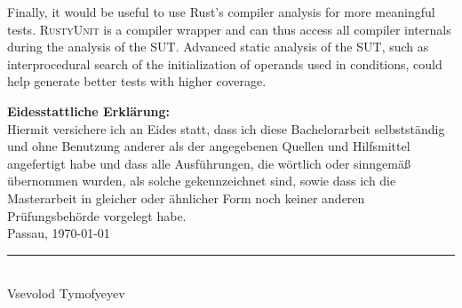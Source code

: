 \documentclass[paper=a4,%
  twoside,%
  BCOR4mm,%
  abstract=true,%
  toc=bibliography,%
  chapterprefix=true,%
  toc=bibliographynumbered,%
  open=right,%
  english,%
  pagesize=pdftex]{scrreprt}
\newcommand{\tech}{\textsc{RustyUnit}\xspace}
\newcommand{\sut}{\ac{SUT}\xspace}
\begin{document}
Finally, it would be useful to use Rust's compiler analysis for more meaningful tests. \tech is a compiler wrapper and can thus access all compiler internals during the analysis of the \sut. Advanced static analysis of the \sut, such as interprocedural search of the initialization of operands used in conditions, could help generate better tests with higher coverage. 


\backmatter%
\appendix
\cleardoublepage
\thispagestyle{empty}
\null\vfill
\noindent\textbf{Eidesstattliche Erklärung:}\\[1.5ex]
Hiermit versichere ich an Eides statt, dass ich diese Bachelorarbeit
selbstständig und ohne Benutzung anderer als der angegebenen Quellen und
Hilfsmittel angefertigt habe und dass alle Ausführungen, die wörtlich oder
sinngemäß übernommen wurden, als solche gekennzeichnet sind, sowie dass ich die
Masterarbeit in gleicher oder ähnlicher Form noch keiner anderen
Prüfungsbehörde vorgelegt habe.\\[1.5cm]
Passau, \today\quad\rule{6cm}{0.1mm}\\
\null\hspace{5cm} {\small Vsevolod Tymofyeyev}

\clearpage


\clearpage
\printbibliography
\end{document}
